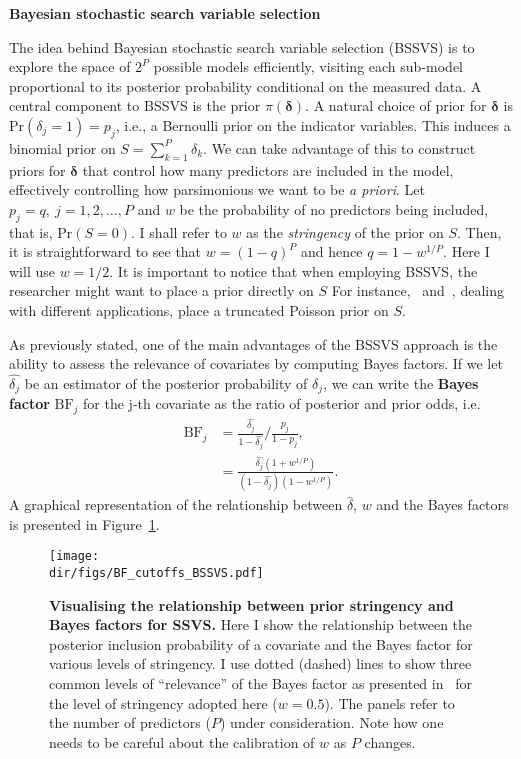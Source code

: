 \textbf{Bayesian stochastic search variable selection}

The idea behind Bayesian stochastic search variable selection (BSSVS) is to explore the space of $2^P$ possible models efficiently, visiting each sub-model proportional to its posterior probability conditional on the measured data.
A central component to BSSVS is the prior $\pi(\boldsymbol\delta)$.
A natural choice of prior for $\boldsymbol\delta$ is $\text{Pr}(\delta_j = 1) = p_j$, i.e., a Bernoulli prior on the indicator variables.
This induces a binomial prior on $S = \sum_{k=1}^P \delta_k$.
We can take advantage of this to construct priors for $\boldsymbol\delta$ that control how many predictors are included in the model, effectively controlling how parsimonious we want to be \textit{a priori}.
Let $p_j = q, \: j = 1, 2, \ldots, P$ and $w$ be the probability of no predictors being included, that is,  $\text{Pr}(S = 0)$.
I shall refer to $w$ as the \textit{stringency} of the prior on $S$.
Then, it is straightforward to see that $w = (1-q)^P$ and hence $q = 1 - w^{1/P}$.
Here I will use $w = 1/2$.
It is important to notice that when employing BSSVS, the researcher might want to place a prior directly on $S$
For instance,~\cite{Lemey2009} and~\cite{Drummond2010}, dealing with different applications, place a truncated Poisson prior on $S$.

As previously stated, one of the main advantages of the BSSVS approach is the ability to assess the relevance of covariates by computing Bayes factors.
If we let $\hat{\delta_j}$  be an estimator of the posterior probability of $\delta_j$, we can write the \textbf{Bayes factor}  $\text{BF}_j$ for the j-th covariate as the ratio of posterior and prior odds, i.e.
\begin{align}
 \text{BF}_j &= \frac{\hat{\delta_j} }{1-\hat{\delta_j} }/\frac{p_j}{1-p_j}, \\
  &= \frac{\hat{\delta_j} (1 + w^{1/P})}{(1-\hat{\delta_j})(1 - w^{1/P}) }.
\end{align}
A graphical representation of the relationship between $\hat{\delta}$, $w$ and the Bayes factors is presented in Figure~\ref{fig:BFcalibration}.

\begin{figure}[htbp]
  \centering
  \texttt{[image: \\dir/figs/BF\_cutoffs\_BSSVS.pdf]}
  \caption[Visualising the relationship between prior stringency and Bayes factors for SSVS]{\textbf{Visualising the relationship between prior stringency and Bayes factors for SSVS.}
  Here I show the relationship between the posterior inclusion probability of a covariate and the Bayes factor for various levels of stringency.
  I use dotted (dashed) lines to show three common levels of ``relevance'' of the Bayes factor as presented in~\cite{Kass1995} for the level of stringency adopted here ($w = 0.5$).
  The panels refer to the number of predictors ($P$) under consideration.
  Note how one needs to be careful about the calibration of $w$ as $P$ changes.
  }
  \label{fig:BFcalibration}
\end{figure}

